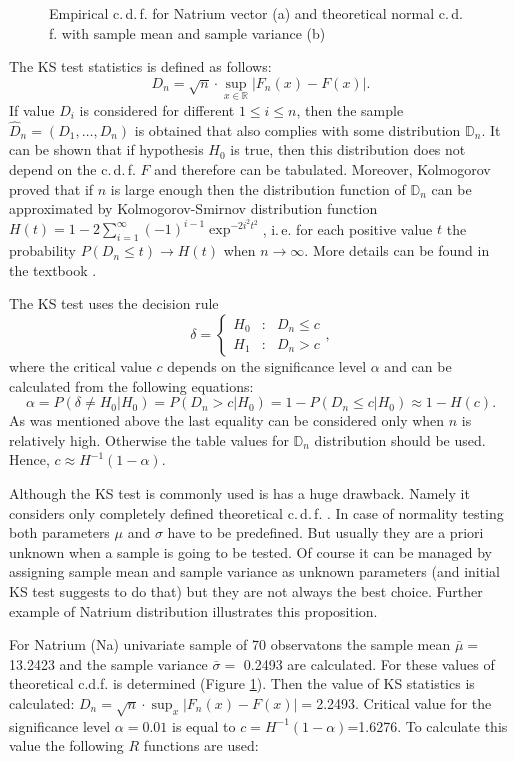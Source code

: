 \documentclass[a4paper, 12pt, titlepage, headsepline, listof = totoc, bibliography = totoc, numbers = noenddot]{scrartcl}
\newcommand{\ie}{i.\,e. }
\newcommand{\cdf}{c.\,d.\,f. }
\begin{document}
\begin{figure}[H]
\begin{subfigure}{.5\textwidth}
  \vspace{-1cm}
  \caption{}
  \label{fig:empiricTeorFunc}
\end{subfigure}
\caption{Empirical \cdf for Natrium vector (a) and theoretical normal \cdf with
sample mean and sample variance (b)}
\label{fig:commonFigureKStest}
\end{figure}

The KS test statistics is defined as follows:
\[D_n = \sqrt{n}\cdot \sup_{x \in \mathbb{R}}|F_n(x)-F(x)|.\]
If value $D_i$ is considered for different $1\le i\le n$, then the sample
$\hat{D}_n=(D_1,\dots,D_n)$ is obtained that also complies with some
distribution $\mathbb{D}_n$.
It can be shown that if hypothesis $H_0$ is true, then this distribution does not depend on the \cdf $F$
and therefore can be tabulated. Moreover, Kolmogorov proved that if $n$ is large
enough then the distribution function of $\mathbb{D}_n$ can be approximated by
Kolmogorov-Smirnov distribution function
$H(t)=1-2\sum_{i=1}^{\infty}(-1)^{i-1} \exp^{-2i^2t^2}$, \ie for each positive
value $t$ the probability $P(D_n\le t)\to H(t)$ when $n \to \infty$. More
details can be found in the textbook \cite{De02}.

The KS test uses the decision rule
\[ \delta = 
\left\{
\begin{array}{rcl}
H_0&:& D_n\le c\\
H_1&:& D_n> c
\end{array}
\right.,
\]
where the critical value $c$ depends on the significance level $\alpha$ and
can be calculated from the following equations:
\[\alpha = P(\delta \ne H_0|H_0)=P(D_n>c|H_0)=1-P(D_n\le c|H_0)\approx 1-H(c).\]
As was mentioned above the last equality can be considered only when $n$ is
relatively high. Otherwise the table values for $\mathbb{D}_n$ distribution
should be used. Hence, $c\approx H^{-1}(1-\alpha)$.

Although the KS test is commonly used is has a huge drawback. Namely it
considers only completely defined theoretical \cdf. In case of normality testing
both parameters $\mu$ and $\sigma$ have to be predefined. But usually they are
a priori unknown when a sample is going to be tested. Of course it can be
managed by assigning sample mean and sample variance as unknown parameters (and
initial KS test suggests to do that) but they are not always the best choice.
Further example of Natrium distribution illustrates this proposition. 

For Natrium (Na) univariate sample of 70 observatons the sample mean
$\bar{\mu}=$13.2423 and the sample variance $\bar{\sigma}=$
0.2493 are calculated. For these values of
theoretical c.d.f. is determined (Figure \ref{fig:empiricTeorFunc}). Then
the value of KS statistics is calculated: $D_n=\sqrt{n}\cdot
\sup_x|F_n(x)-F(x)|=$2.2493.
Critical value for the significance level $\alpha=0.01$ is equal to
$c=H^{-1}(1-\alpha)$=1.6276. To
calculate this value the following $R$ functions are used:
\end{document}
